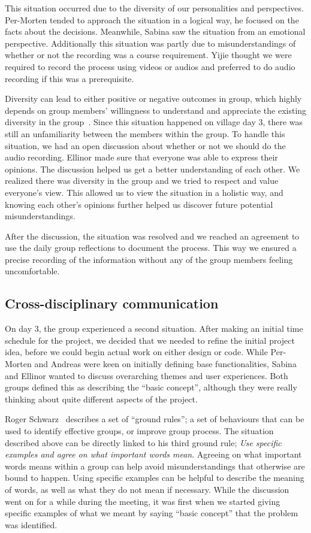 This situation occurred due to the diversity of our personalities and perspectives. Per-Morten tended to approach the situation in a logical way, he focused on the facts about the decisions. Meanwhile, Sabina saw the situation from an emotional perspective. 
Additionally this situation was partly due to misunderstandings of whether or not the recording was a course requirement. Yijie thought we were required to record the process using videos or audios and preferred to do audio recording if this was a prerequisite.  

Diversity can lead to either positive or negative outcomes in group, which highly depends on group members' willingness to understand and appreciate the existing diversity in the group~\cite{2013johnson}. Since this situation happened on village day 3, there was still an unfamiliarity between the members within the group. To handle this situation, we had an open discussion about whether or not we should do the audio recording. Ellinor made sure that everyone was able to express their opinions.
The discussion helped us get a better understanding of each other. We realized there was diversity in the group and we tried to respect and value everyone’s view. This allowed us to view the situation in a holistic way, and knowing each other’s opinions further helped us discover future potential misunderstandings.

After the discussion, the situation was resolved and we reached an agreement to use the daily group reflections to document the process. This way we ensured a precise recording of the information without any of the group members feeling uncomfortable. 

\subsection{Cross-disciplinary communication}
On day 3, the group experienced a second situation. After making an initial time schedule for the project, we decided that we needed to refine the initial project idea, before we could begin actual work on either design or code. While Per-Morten and Andreas were keen on initially defining base functionalities, Sabina and Ellinor wanted to discuss overarching themes and user experiences. Both groups defined this as describing the “basic concept”, although they were really thinking about quite different aspects of the project. 

Roger Schwarz~\cite{scharz} describes a set of “ground rules”; a set of behaviours that can be used to identify effective groups, or improve group process. The situation described above can be directly linked to his third ground rule; \textit{Use specific examples and agree on what important words mean}. Agreeing on what important words means within a group can help avoid misunderstandings that otherwise are bound to happen. Using specific examples can be helpful to describe the meaning of words, as well as what they do not mean if necessary. While the discussion went on for a while during the meeting, it was first when we started giving specific examples of what we meant by saying “basic concept” that the problem was identified. 

